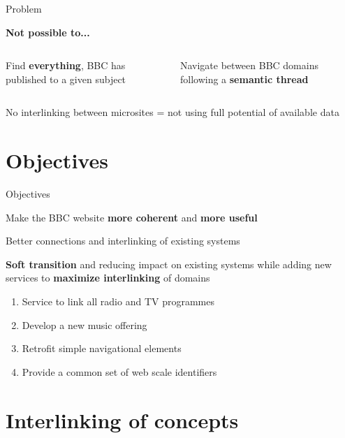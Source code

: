 \documentclass[10pt]{beamer}
\begin{document}
\begin{frame}[fragile]{Problem}

  \alert{\textbf{Not possible to...}}
  \bigskip

  \begin{columns}[T,onlytextwidth]
      Find \textbf{everything}, BBC has published to a given subject

      Navigate between BBC domains following a \textbf{semantic thread}
  \end{columns}

  \bigskip
  No interlinking between microsites = not using full potential of available data

\end{frame}


\section{Objectives}

\begin{frame}[fragile]{Objectives}

  Make the BBC website \alert{\textbf{more coherent}} and \alert{\textbf{more useful}}
  \bigskip

  \pause
  Better connections and interlinking of existing systems

  \textbf{Soft transition} and reducing impact on existing systems while adding new services to \textbf{maximize interlinking} of domains

  \pause
  \begin{enumerate}[<+->]
    \item \alert<7>{Service to link all radio and TV programmes}
    \item Develop a new music offering
    \item Retrofit simple navigational elements
    \item \alert<7>{Provide a common set of web scale identifiers}
  \end{enumerate}

\end{frame}


\section{Interlinking of concepts}
\end{document}

